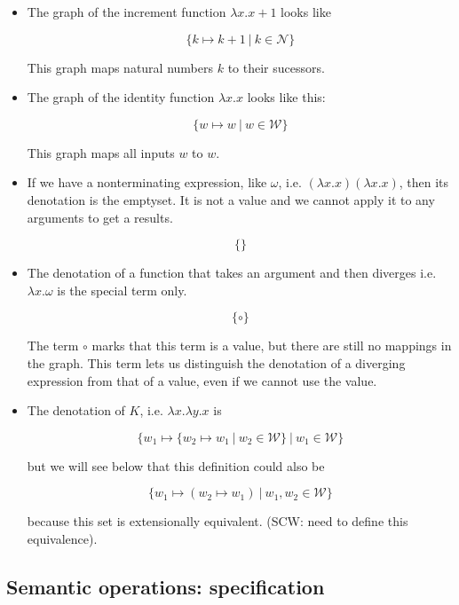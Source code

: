 \documentclass{article}
\theoremstyle{definition}
\begin{document}
\begin{itemize}

\item The graph of the increment function $\lambda x. x+1$ looks like

\[ \{ k \mapsto k+1\ |\ k \in \mathcal{N} \} \]

This graph maps natural numbers $k$ to their sucessors.

\item The graph of the identity function $\lambda x.x$ looks like this:

\[ \{ w \mapsto w\ |\ w \in \mathcal{W} \} \]

This graph maps all inputs $w$ to $w$. 

\item If we have a nonterminating expression, like $\omega$, i.e. 
  $(\lambda x.x)(\lambda x.x)$,
  then its denotation is the emptyset.  It is not
  a value and we cannot apply it to any arguments to get a results.

   \[ \{\} \]

\item The denotation of a function that takes an argument and then diverges
  i.e. $\lambda x. \omega$ is the special term only.

  \[ \{ \circ \} \]

  The term $\circ$ marks that this term is a value, but there are still no mappings
  in the graph. This term lets us distinguish the denotation of a diverging
  expression from that of a value, even if we cannot use the value.

\item The denotation of $K$, i.e. $\lambda x.\lambda y.x$ is  

  \[ \{ w_1 \mapsto \{ w_2 \mapsto w_1\ |\ w_2 \in \mathcal{W} \}\ |\ w_1 \in \mathcal{W} \} \]

\noindent but we will see below that this definition could also be 

  \[ \{ w_1 \mapsto (w_2 \mapsto w_1)\ |\ w_1, w_2 \in \mathcal{W} \} \]

because this set is extensionally equivalent. (SCW: need to define this equivalence).

\end{itemize}


\subsection{Semantic operations: specification}
\end{document}
